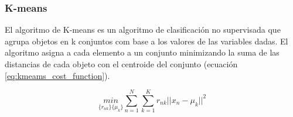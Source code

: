 \subsubsection{K-means \label{sec:kmeans}}

El algoritmo de K-means es un algoritmo de clasificación no supervisada que agrupa objetos en k conjuntos com base a los valores de las variables dadas. El algoritmo asigna a cada elemento a un conjunto minimizando la suma de las distancias de cada objeto con el centroide del conjunto (ecuación \ref{eq:kmeams_cost_function}).

\begin{equation}
    \underset{\{r_{nk}\}\{\mu_k\}}{min} \sum_{n=1}^N \sum_{k=1}^K r_{nk} ||x_n-\mu_k||^2
    \label{eq:kmeams_cost_function}
\end{equation}